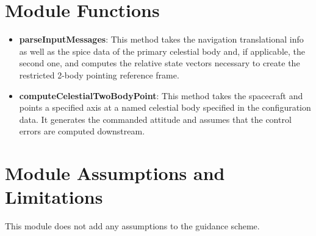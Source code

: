 

\section{Module Functions}
\begin{itemize}
	\item \textbf{parseInputMessages}: This method takes the navigation translational info as well as the spice data of the primary celestial body and, if applicable, the second one, and computes the relative state vectors necessary to create the restricted 2-body pointing reference frame.
	\item \textbf{computeCelestialTwoBodyPoint}: This method takes the spacecraft and points a specified axis at a named
 celestial body specified in the configuration data.  It generates the commanded attitude and assumes that the control errors are computed downstream.	
 \end{itemize}

\section{Module Assumptions and Limitations}
This module does not add any assumptions to the guidance scheme.